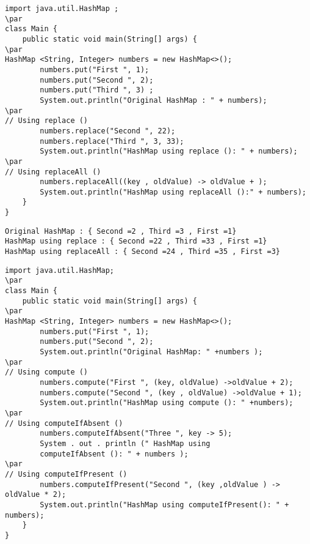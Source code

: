 \documentclass{book}
\def\lthtmlcheckvsize{\ifdim\ht\sizebox<\vsize 
  \ifdim\wd\sizebox<\hsize\expandafter\hfill\fi \expandafter\vfill
  \else\expandafter\vss\fi}%
\begin{document}
{\newpage\clearpage
{}%
\begin{lstlisting}
import java.util.HashMap ;
\par
class Main {
	public static void main(String[] args) {
\par
HashMap <String, Integer> numbers = new HashMap<>();
		numbers.put("First ", 1);
		numbers.put("Second ", 2);
		numbers.put("Third ", 3) ;
		System.out.println("Original HashMap : " + numbers);
\par
// Using replace ()
		numbers.replace("Second ", 22);
		numbers.replace("Third ", 3, 33);
		System.out.println("HashMap using replace (): " + numbers);
\par
// Using replaceAll ()
		numbers.replaceAll((key , oldValue) -> oldValue + );
		System.out.println("HashMap using replaceAll ():" + numbers);
	}
}
\end{lstlisting}%
\lthtmlfigureZ
\lthtmlcheckvsize\clearpage}

{\newpage\clearpage
{}%
\begin{lstlisting}
Original HashMap : { Second =2 , Third =3 , First =1}
HashMap using replace : { Second =22 , Third =33 , First =1}
HashMap using replaceAll : { Second =24 , Third =35 , First =3}
\end{lstlisting}%
\lthtmlfigureZ
\lthtmlcheckvsize\clearpage}

{\newpage\clearpage
{}%
\begin{lstlisting}
import java.util.HashMap;
\par
class Main {
	public static void main(String[] args) {
\par
HashMap <String, Integer> numbers = new HashMap<>();
		numbers.put("First ", 1);
		numbers.put("Second ", 2);
		System.out.println("Original HashMap: " +numbers );
\par
// Using compute ()
		numbers.compute("First ", (key, oldValue) ->oldValue + 2);
		numbers.compute("Second ", (key , oldValue) ->oldValue + 1);
		System.out.println("HashMap using compute (): " +numbers);
\par
// Using computeIfAbsent ()
		numbers.computeIfAbsent("Three ", key -> 5);
		System . out . println (" HashMap using
		computeIfAbsent (): " + numbers );
\par
// Using computeIfPresent ()
		numbers.computeIfPresent("Second ", (key ,oldValue ) -> oldValue * 2);
		System.out.println("HashMap using computeIfPresent(): " + numbers);
	}
}
\end{lstlisting}%
\lthtmlfigureZ
\lthtmlcheckvsize\clearpage}
\end{document}
